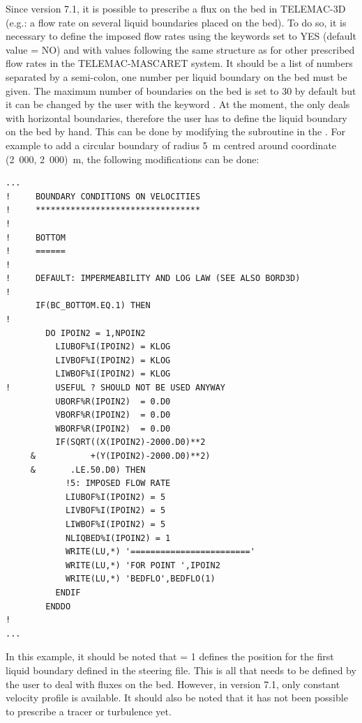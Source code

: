 Since version 7.1, it is possible to prescribe a flux on the bed in TELEMAC-3D
(e.g.: a flow rate on several liquid boundaries placed on the bed).
To do so, it is necessary to define the imposed flow rates using the keywords
 set to YES (default value = NO)
and  with values following the same
structure as for other prescribed flow rates in the TELEMAC-MASCARET system.
It should be a list of numbers separated by a semi-colon, one number per
liquid boundary on the bed must be given.
The maximum number of boundaries on the bed is set to 30 by default
but it can be changed by the user with the keyword .
At the moment, the  only deals with horizontal
boundaries, therefore the user has to define the liquid boundary on the bed by hand.
This can be done by modifying the subroutine 
in the .
For example to add a circular boundary of radius 5~m centred around coordinate
(2~000, 2~000)~m, the following modifications can be done:
\begin{lstlisting}[language=TelFortran]
...
!     BOUNDARY CONDITIONS ON VELOCITIES
!     *********************************
!
!     BOTTOM
!     ======
!
!     DEFAULT: IMPERMEABILITY AND LOG LAW (SEE ALSO BORD3D)
!
      IF(BC_BOTTOM.EQ.1) THEN
!
        DO IPOIN2 = 1,NPOIN2
          LIUBOF%I(IPOIN2) = KLOG
          LIVBOF%I(IPOIN2) = KLOG
          LIWBOF%I(IPOIN2) = KLOG
!         USEFUL ? SHOULD NOT BE USED ANYWAY
          UBORF%R(IPOIN2)  = 0.D0
          VBORF%R(IPOIN2)  = 0.D0
          WBORF%R(IPOIN2)  = 0.D0
          IF(SQRT((X(IPOIN2)-2000.D0)**2
     &           +(Y(IPOIN2)-2000.D0)**2)
     &       .LE.50.D0) THEN
            !5: IMPOSED FLOW RATE
            LIUBOF%I(IPOIN2) = 5
            LIVBOF%I(IPOIN2) = 5
            LIWBOF%I(IPOIN2) = 5
            NLIQBED%I(IPOIN2) = 1
            WRITE(LU,*) '========================'
            WRITE(LU,*) 'FOR POINT ',IPOIN2
            WRITE(LU,*) 'BEDFLO',BEDFLO(1)
          ENDIF
        ENDDO
!
...
\end{lstlisting}

In this example, it should be noted that  = 1
defines the position for the first liquid boundary defined in the steering file.
This is all that needs to be defined by the user to deal with fluxes on the bed.
However, in version 7.1, only constant velocity profile is available.
It should also be noted that it has not been possible to prescribe a tracer
or turbulence yet.

